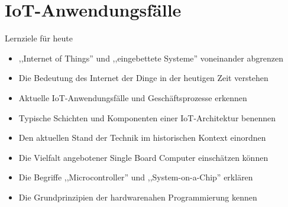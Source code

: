 \section{IoT-Anwendungsfälle}

\begin{frame}{Lernziele für heute}
    \begin{itemize}
        \item ,,Internet of Things'' und ,,eingebettete Systeme'' voneinander abgrenzen
        \item Die Bedeutung des Internet der Dinge in der heutigen Zeit verstehen
        \item Aktuelle IoT-Anwendungsfälle und Geschäftsprozesse erkennen
        \item Typische Schichten und Komponenten einer IoT-Architektur benennen
        \item Den aktuellen Stand der Technik im historischen Kontext einordnen
        \item Die Vielfalt angebotener Single Board Computer einschätzen können
        \item Die Begriffe ,,Microcontroller'' und ,,System-on-a-Chip'' erklären
        \item Die Grundprinzipien der hardwarenahen Programmierung kennen
    \end{itemize}
\end{frame}


